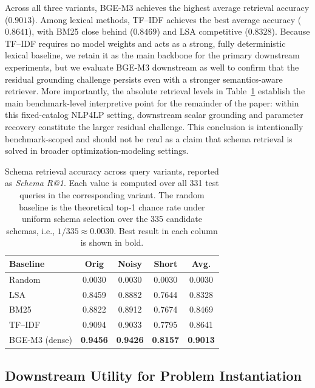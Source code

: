 \documentclass[3p]{elsarticle}
\begin{document}
Across all three variants, BGE-M3 achieves the highest average retrieval accuracy ($0.9013$). Among lexical methods, TF--IDF achieves the best average accuracy ($0.8641$), with BM25 close behind ($0.8469$) and LSA competitive ($0.8328$). Because TF--IDF requires no model weights and acts as a strong, fully deterministic lexical baseline, we retain it as the main backbone for the primary downstream experiments, but we evaluate BGE-M3 downstream as well to confirm that the residual grounding challenge persists even with a stronger semantics-aware retriever. More importantly, the absolute retrieval levels in Table~\ref{tab:nlp4lp-retrieval-main} establish the main benchmark-level interpretive point for the remainder of the paper: within this fixed-catalog \textsc{NLP4LP} setting, downstream scalar grounding and parameter recovery constitute the larger residual challenge. This conclusion is intentionally benchmark-scoped and should not be read as a claim that schema retrieval is solved in broader optimization-modeling settings.

\begin{table}[t]
  \centering
  \caption{Schema retrieval accuracy across query variants, reported as \textit{Schema R@1}. Each value is computed over all 331 test queries in the corresponding variant. The random baseline is the theoretical top-1 chance rate under uniform schema selection over the 335 candidate schemas, i.e., $1/335 \approx 0.0030$. Best result in each column is shown in bold.}
  \label{tab:nlp4lp-retrieval-main}
  \small
  \begin{tabular}{lcccc}
    \toprule
    Baseline & Orig & Noisy & Short & Avg. \\
    \midrule
    Random  & 0.0030 & 0.0030 & 0.0030 & 0.0030 \\
    LSA     & 0.8459 & 0.8882 & 0.7644 & 0.8328 \\
    BM25    & 0.8822 & 0.8912 & 0.7674 & 0.8469 \\
    TF--IDF & 0.9094 & 0.9033 & 0.7795 & 0.8641 \\
    BGE-M3 (dense) & \textbf{0.9456} & \textbf{0.9426} & \textbf{0.8157} & \textbf{0.9013} \\
    \bottomrule
  \end{tabular}
\end{table}

\subsection{Downstream Utility for Problem Instantiation}
\label{subsec:exp_downstream}
\end{document}
